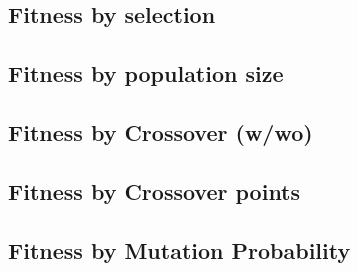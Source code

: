 \documentclass[a4paper]{article}
\begin{document}
\subsection{Fitness by selection}
\label{sec:fitness_by_selection}


\subsection{Fitness by population size}
\label{sec:fitness_by_population_size}


\subsection{Fitness by Crossover (w/wo)}
\label{sec:crossover_on_off}


\subsection{Fitness by Crossover points}
\label{sec:crossover_points}


\eject \pdfpagewidth=420.0mm \pdfpageheight=297.0mm

\subsection{Fitness by Mutation Probability}
\label{sec:mutation}

\end{document}
